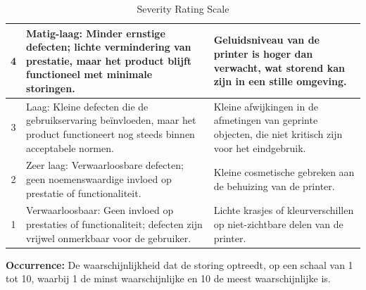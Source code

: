 \documentclass{article}
\begin{document}
\begin{table}[!ht]
\begin{tabular}{|c|p{6.5cm}|p{6.5cm}|}
    \hline
    4&
    Matig-laag: Minder ernstige defecten; lichte vermindering van prestatie, maar het product blijft functioneel met minimale storingen.&
    Geluidsniveau van de printer is hoger dan verwacht, wat storend kan zijn in een stille omgeving.\\
    \hline
    3	&
    Laag: Kleine defecten die de gebruikservaring beïnvloeden, maar het product functioneert nog steeds binnen acceptabele normen.	&
    Kleine afwijkingen in de afmetingen van geprinte objecten, die niet kritisch zijn voor het eindgebruik.\\
    \hline
    2	&
    Zeer laag: Verwaarloosbare defecten; geen noemenswaardige invloed op prestatie of functionaliteit.	&
    Kleine cosmetische gebreken aan de behuizing van de printer.\\
    \hline
    1	&
    Verwaarloosbaar: Geen invloed op prestaties of functionaliteit; defecten zijn vrijwel onmerkbaar voor de gebruiker.&	
    Lichte krasjes of kleurverschillen op niet-zichtbare delen van de printer.\\
    \hline
  \end{tabular}
\caption{Severity Rating Scale}
\label{tab:Severity}
\end{table}

\textbf{Occurrence:} De waarschijnlijkheid dat de storing optreedt, op een schaal van 1 tot 10, waarbij 1 de minst waarschijnlijke en 10 de meest waarschijnlijke is.
\end{document}
